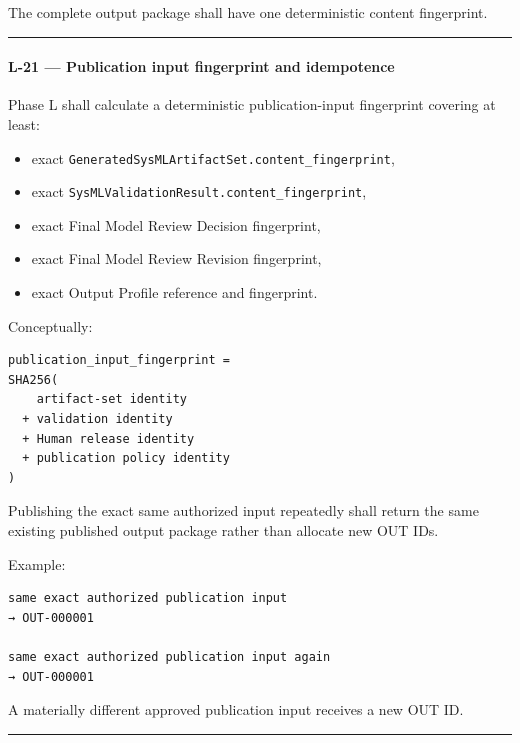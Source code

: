 The complete output package shall have one deterministic content fingerprint.

\begin{center}\rule{0.5\linewidth}{0.5pt}\end{center}

\hypertarget{l-21--publication-input-fingerprint-and-idempotence}{%
\paragraph{L-21 --- Publication input fingerprint and idempotence}\label{l-21--publication-input-fingerprint-and-idempotence}}

Phase L shall calculate a deterministic publication-input fingerprint covering at least:

\begin{itemize}
\tightlist
\item
  exact \texttt{GeneratedSysMLArtifactSet.content\_fingerprint},
\item
  exact \texttt{SysMLValidationResult.content\_fingerprint},
\item
  exact Final Model Review Decision fingerprint,
\item
  exact Final Model Review Revision fingerprint,
\item
  exact Output Profile reference and fingerprint.
\end{itemize}

Conceptually:

\begin{verbatim}
publication_input_fingerprint =
SHA256(
    artifact-set identity
  + validation identity
  + Human release identity
  + publication policy identity
)
\end{verbatim}

Publishing the exact same authorized input repeatedly shall return the same existing published output package rather than allocate new OUT IDs.

Example:

\begin{verbatim}
same exact authorized publication input
→ OUT-000001

same exact authorized publication input again
→ OUT-000001
\end{verbatim}

A materially different approved publication input receives a new OUT ID.

\begin{center}\rule{0.5\linewidth}{0.5pt}\end{center}

